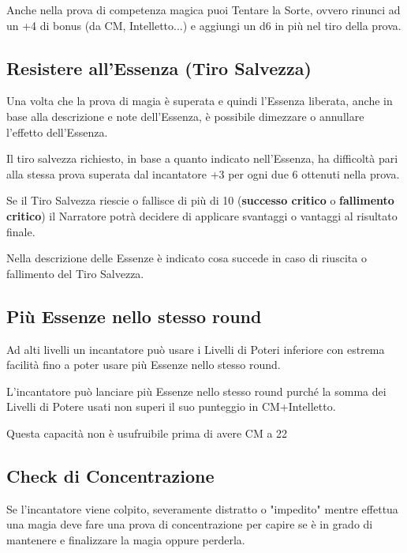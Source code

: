 \documentclass[a4paper,11pt,twoside,openany]{book}
\begin{document}
Anche nella prova di competenza magica puoi Tentare la Sorte, ovvero rinunci ad un +4 di bonus (da CM, Intelletto...) e aggiungi un d6 in più nel tiro della prova.

\subsection{Resistere all'Essenza (Tiro Salvezza)}

\label{resistere-allessenza-tiro-salvezza}

Una volta che la prova di magia è superata e quindi l'Essenza liberata, anche in base alla descrizione e note dell'Essenza, è possibile dimezzare o annullare l'effetto dell'Essenza.

Il tiro salvezza richiesto, in base a quanto indicato nell'Essenza, ha difficoltà pari alla stessa prova superata dal incantatore +3 per ogni due 6 ottenuti nella prova.

Se il Tiro Salvezza riescie o fallisce di più di 10 (\textbf{successo critico} o \textbf{fallimento critico}) il Narratore potrà decidere di applicare svantaggi o vantaggi al risultato finale.

Nella descrizione delle Essenze è indicato cosa succede in caso di riuscita o fallimento del Tiro Salvezza.

\subsection{Più Essenze nello stesso round}

Ad alti livelli un incantatore può usare i Livelli di Poteri inferiore con estrema facilità fino a poter usare più Essenze nello stesso round.

L'incantatore può lanciare più Essenze nello stesso round purché la somma dei Livelli di Potere usati non superi il suo punteggio in CM+Intelletto.

Questa capacità non è usufruibile prima di avere CM a 22

\subsection{Check di Concentrazione}

Se l'incantatore viene colpito, severamente distratto o "impedito" mentre effettua una magia deve fare una prova di concentrazione per capire se è in grado di mantenere e finalizzare la magia oppure perderla.
\end{document}
